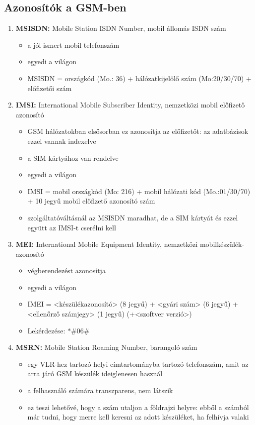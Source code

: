 \documentclass[10pt,a4paper]{article}
\begin{document}
\subsection{Azonosítók a GSM-ben}
\begin{enumerate}
	\item \textbf{MSISDN:} Mobile Station ISDN Number, mobil állomás
	ISDN szám
	\begin{itemize}
		\item a jól ismert mobil telefonszám
		\item egyedi a világon
		\item  MSISDN = országkód (Mo.: 36) + hálózatkijelölő szám
		(Mo:20/30/70) + előfizetői szám
	\end{itemize}
	\item \textbf{IMSI:} International Mobile Subscriber Identity,
	nemzetközi mobil előfizető azonosító
	\begin{itemize}
		\item GSM hálózatokban elsősorban ez azonosítja az előfizetőt: az
		adatbázisok ezzel vannak indexelve
		\item a SIM kártyához van rendelve
		\item egyedi a világon
		\item IMSI = mobil országkód (Mo: 216) + mobil hálózati kód
		(Mo.:01/30/70) + 10 jegyű mobil előfizető azonosító szám
		\item szolgáltatóváltásnál az MSISDN maradhat, de a SIM kártyát és
		ezzel együtt az IMSI-t cserélni kell 
	\end{itemize}
	\item \textbf{MEI:} International Mobile Equipment Identity,
	nemzetközi mobilkészülék-azonosító
	\begin{itemize}
		\item  végberendezést azonosítja
		\item egyedi a világon
		\item IMEI = <készülékazonosító> (8 jegyű) + <gyári szám> (6 jegyű)
		+ <ellenőrző számjegy> (1 jegyű) (+<szoftver verzió>)
		\item Lekérdezése: $*\#06\#$
	\end{itemize}
	\item \textbf{MSRN:} Mobile Station Roaming Number, barangoló szám
	\begin{itemize}
		\item egy VLR-hez tartozó helyi címtartományba tartozó telefonszám,
		amit az arra járó GSM készülék ideiglenesen használ
		\item a felhasználó számára transzparens, nem látszik
		\item ez teszi lehetővé, hogy a szám utaljon a földrajzi helyre: ebből a
		számból már tudni, hogy merre kell keresni az adott készüléket,
		ha felhívja valaki
	\end{itemize}
\end{enumerate}
\end{document}
